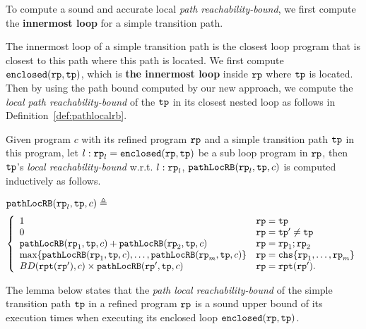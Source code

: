 To compute a sound and accurate local \emph{path reachability-bound},
we first compute the \textbf{innermost loop} for a simple transition path.
\begin{defn}
  \label{def:innermost}
\end{defn}
The innermost loop of a simple transition path is the closest loop program that is closest to this path where this path is located.
We first compute $\mathtt{enclosed}(\mathtt{rp}, \mathtt{tp})$, which is \textbf{the innermost loop} inside $\mathtt{rp}$ where $\mathtt{tp}$ is located. Then by using the path bound computed by our new approach, we compute the \emph{local path reachability-bound} of
the $\mathtt{tp}$ in its closest nested loop as follows in Definition~\ref{def:pathlocalrb}.
\begin{defn}
    \label{def:pathlocalrb}
    Given program $c$ with its refined program $\mathtt{rp}$ and a simple transition path $\mathtt{tp}$ in this program, 
    let $l: \mathtt{rp}_l = \mathtt{enclosed}(\mathtt{rp}, \mathtt{tp})$ be a sub loop program in $\mathtt{rp}$,
    then $\mathtt{tp}$'s \emph{local reachability-bound} w.r.t. $l: \mathtt{rp}_l$,
    $\mathtt{pathLocRB}(\mathtt{rp}_l, \mathtt{tp}, c)$
    is computed inductively as follows.

    $\mathtt{pathLocRB}(\mathtt{rp}_l, \mathtt{tp}, c) \triangleq$
    \[ 
      \left\{
    \begin{array}{ll}
       1  & \rprog = \tpath\\
      {0} & \rprog = \tpath' \neq \tpath\\
      \outinB(\rprog_1, \tpath, c) + \outinB(\rprog_2, \tpath, c) & \rprog = \rprog_1;\rprog_2 \\
      \max\left\{ \outinB(\rprog_1, \tpath, c), \ldots, \outinB(\rprog_m, \tpath, c) \right\} 
      & \rprog = \rpchoose{\rprog_1, \ldots, \rprog_m } \\
      BD(\rprepeat(\rprog'), c) \times \outinB(\rprog', \tpath, c) & \rprog = \rprepeat(\rprog').
    \end{array}
    \right.
    \]
\end{defn}
The lemma below states that the \emph{path local reachability-bound} of the simple transition path $\mathtt{tp}$ in a refined program $\mathtt{rp}$ is a sound upper bound of its execution times when executing its enclosed loop $\mathtt{enclosed}(\mathtt{rp}, \mathtt{tp})$.
